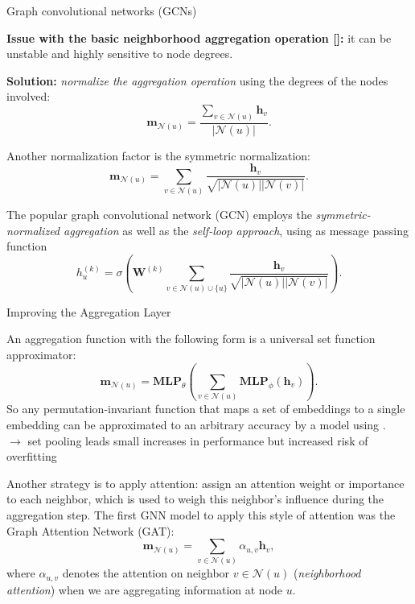 \documentclass[10pt, aspectratio=169, compress, protectframetitle, handout]{beamer}
\begin{document}
\begin{frame}{Graph convolutional networks (GCNs)}

    \textbf{Issue with the basic neighborhood aggregation operation []:} it can be \alert{unstable} and \alert{highly sensitive to node degrees}.
    
    \textbf{Solution:} \emph{normalize the aggregation operation} using the degrees of the nodes involved:
    \begin{equation}
        \mathbf m_{\mathcal N(u)} = \frac{\sum_{v \in \mathcal N(u)} \mathbf h_v}{|\mathcal N(u)|}.
    \end{equation}
    
    Another normalization factor is the \alert{symmetric normalization}:
    \begin{equation}
        \mathbf m_{\mathcal N(u)} = \sum_{v \in \mathcal N(u)} \frac{\mathbf h_v}{\sqrt{|\mathcal N(u)| |\mathcal N(v)|}}.
    \end{equation}
    
    The popular \alert{graph convolutional network (GCN)} employs the \emph{symmetric-normalized aggregation} as well as the \emph{self-loop approach}, using as message passing function
    \begin{equation}
        h^{(k)}_u = \sigma \left( \mathbf W^{(k)} \sum_{v \in \mathcal N(u) \cup \{u\}} \frac{\mathbf h_v}{\sqrt{|\mathcal N(u)| |\mathcal N(v)|}} \right).
    \end{equation}

\end{frame}


\begin{frame}{Improving the Aggregation Layer}

    An aggregation function with the following form is a \alert{universal set function approximator}:
    \begin{equation}
        \mathbf m_{\mathcal N(u)} = \textbf{MLP}_\theta \left( \sum_{v \in \mathcal N(u)} \textbf{MLP}_\phi (\mathbf h_v) \right).
        \label{eq:univsetapproxf}
    \end{equation}
    So any permutation-invariant function that maps a set of embeddings to a single embedding can be approximated to an arbitrary accuracy by a model using .\\
    $\longrightarrow$ \alert{set pooling} leads small increases in performance but increased risk of overfitting
    
    Another strategy is to apply \alert{attention}: assign an attention weight or importance to each neighbor, which is used to weigh this neighbor's influence during the aggregation step. The first GNN model to apply this style of attention was the \alert{Graph Attention Network (GAT)}:
    \begin{equation}
        \mathbf m_{\mathcal N(u)} = \sum_{v \in \mathcal N(u)} \alpha_{u,v} \mathbf h_v,
    \end{equation}
    where $\alpha_{u,v}$ denotes the attention on neighbor $v \in \mathcal N(u)$ (\emph{neighborhood attention}) when we are aggregating information at node $u$.
    
\end{frame}
\end{document}
